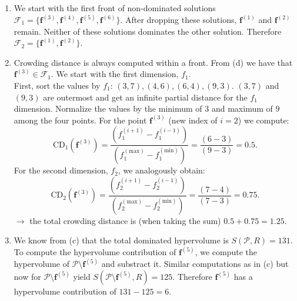 \documentclass[a4paper]{article}
\begin{document}
{\begin{enumerate}
  For the four rectangles from left to right:
  \begin{itemize}
    \item $(4-3) \cdot (15-7) = 8$
    \item $(6-4) \cdot (15-6) = 18$
    \item $(9-6) \cdot (15-4) = 33$
    \item $(15-9) \cdot (15-3) = 72$
  \end{itemize}
  $\rightarrow S(\mathcal{P}, R) = 8+18+33+72 = 131$.
\item We start with the first front of non-dominated solutions $\mathcal{F}_{1} = \{\mathbf{f}^{(3)}, \mathbf{f}^{(4)}, \mathbf{f}^{(5)}, \mathbf{f}^{(6)}\}$.
  After dropping these solutions, $\mathbf{f}^{(1)}$ and $\mathbf{f}^{(2)}$ remain. Neither of these solutions dominates the other solution.
  Therefore $\mathcal{F}_{2} = \{\mathbf{f}^{(1)}, \mathbf{f}^{(2)}\}$.
\item Crowding distance is always computed within a front. From (d) we have that $\mathbf{f}^{(3)} \in \mathcal{F}_{1}$.
  We start with the first dimension, $f_{1}$.\\
  First, sort the values by $f_{1}$: $(3,7),(4,6),(6,4),(9,3)$.
  $(3, 7)$ and $(9, 3)$ are outermost and get an infinite partial distance for the $f_{1}$ dimension.
  Normalize the values by the minimum of $3$ and maximum of $9$ among the four points.
  For the point $\mathbf{f}^{(3)}$ (new index of $i = 2$) we compute:
  $$\mathrm{CD}_{1}(\mathbf{f}^{(3)}) = \frac{(f_{1}^{(i+1)} - f_{1}^{(i-1)})}{(f_{1}^{(\mathrm{max})} - f_{1}^{(\mathrm{min})})} = \frac{(6 - 3)}{(9 - 3)} = 0.5.$$
  For the second dimension, $f_{2}$, we analogously obtain:
  $$\mathrm{CD}_{2}(\mathbf{f}^{(3)}) = \frac{(f_{2}^{(i+1)} - f_{2}^{(i-1)})}{(f_{2}^{(\mathrm{max})} - f_{2}^{(\mathrm{min})})} = \frac{(7 - 4)}{(7 - 3)} = 0.75.$$
  $\rightarrow$ the total crowding distance is (when taking the sum) $0.5 + 0.75 = 1.25$.
\item We know from (c) that the total dominated hypervolume is $S(\mathcal{P}, R) = 131$.
  To compute the hypervolume contribution of $\mathbf{f}^{(5)}$, we compute the hypervolume of $\mathcal{P} \setminus \mathbf{f}^{(5)}$ and substract it.
  Similar computations as in (c) but now for $\mathcal{P} \setminus \mathbf{f}^{(5)}$ yield $S(\mathcal{P} \setminus \mathbf{f}^{(5)}, R) = 125$. Therefore $\mathbf{f}^{(5)}$ has a hypervolume contribution of $131 - 125 = 6$.
\end{enumerate}
}
\end{document}
